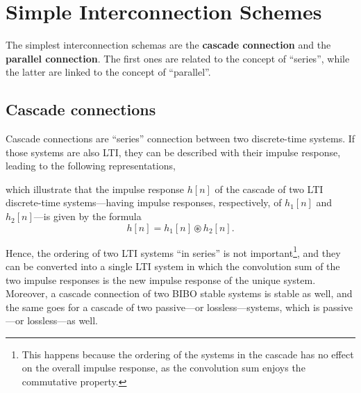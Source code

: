 \documentclass[\documentfontsize, twocolumn]{\classname}
\begin{document}
\section{Simple Interconnection Sche\-mes}

The simplest interconnection schemas are the \textbf{cascade connection} and the \textbf{parallel connection}. The first ones are related to the concept of ``series'', while the latter are linked to the concept of ``parallel''.

\subsection{Cascade connections}

Cascade connections are ``series'' connection between two discrete-time systems. If those systems are also LTI, they can be described with their impulse response, leading to the following representations,
\begin{center}
\end{center}
which illustrate that the impulse response $h[n]$ of the cascade of two LTI discrete-time systems---having impulse responses, respectively, of $h_1[n]$ and $h_2[n]$---is given by the formula
\begin{equation}\label{eqn:cascadeConnectionFormula}
    h[n]=h_1[n] \circledast h_2[n].
\end{equation}

Hence, the ordering of two LTI systems ``in series'' is not important\footnote{This happens because the ordering of the systems in the cascade has no effect on the overall impulse response, as the convolution sum enjoys the commutative property.}, and they can be converted into a single LTI system in which the convolution sum of the two impulse responses is the new impulse response of the unique system. Moreover, a cascade connection of two BIBO stable systems is stable as well, and the same goes for a cascade of two passive---or lossless---systems, which is passive---or lossless---as well.
\end{document}
